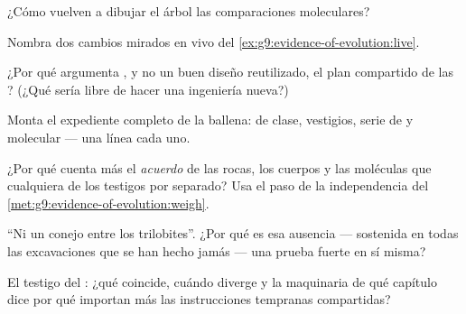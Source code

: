 \begin{exercise}[$\star$]\label{exo:g9:evidence-of-evolution:5}
¿Cómo vuelven a dibujar el árbol las comparaciones moleculares?
\end{exercise}

\begin{exercise}[$\star$]\label{exo:g9:evidence-of-evolution:6}
Nombra dos cambios mirados en vivo del
\cref{ex:g9:evidence-of-evolution:live}.
\end{exercise}

\begin{exercise}[$\star\star$]\label{exo:g9:evidence-of-evolution:7}
¿Por qué argumenta , y no un buen diseño reutilizado, el plan
compartido de las ? (¿Qué sería libre de hacer una
ingeniería nueva?)
\end{exercise}

\begin{exercise}[$\star\star$]\label{exo:g9:evidence-of-evolution:8}
Monta el expediente completo de la ballena:  de clase,
vestigios, serie de  y  molecular --- una línea cada
uno.
\end{exercise}

\begin{exercise}[$\star\star$]\label{exo:g9:evidence-of-evolution:9}
¿Por qué cuenta más el \emph{acuerdo} de las rocas, los cuerpos y las
moléculas que cualquiera de los testigos por separado? Usa el paso de
la independencia del \cref{met:g9:evidence-of-evolution:weigh}.
\end{exercise}

\begin{exercise}[$\star\star$]\label{exo:g9:evidence-of-evolution:10}
``Ni un conejo entre los trilobites''. ¿Por qué es esa ausencia ---
sostenida en todas las excavaciones que se han hecho jamás --- una
prueba fuerte en sí misma?
\end{exercise}

\begin{exercise}[$\star\star$]\label{exo:g9:evidence-of-evolution:11}
El testigo del : ¿qué coincide, cuándo diverge y la maquinaria
de qué capítulo dice por qué importan más las instrucciones tempranas
compartidas?
\end{exercise}

